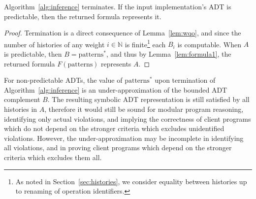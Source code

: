 \begin{theorem}
  \label{thm:algorithm}

  Algorithm~\ref{alg:inference} terminates. If the input implementation’s
  ADT is predictable, then the returned formula represents it.

\end{theorem}

\begin{proof}
  Termination is a direct consequence of Lemma~\ref{lem:wqo}, and since the
  number of histories of any weight $i \in \mathbb{N}$ is finite\footnote{
    As noted in Section~\ref{sec:histories}, we consider equality between
    histories up to renaming of operation identifiers.
  }
  each $B_i$ is computable.
  When $A$ is predictable, then $B = \text{patterns}^*$, and thus by
  Lemma~\ref{lem:formula1}, the returned formula $F(\text{patterns})$
  represents $A$.
\end{proof}

For non-predictable ADTs, the value of $\text{patterns}^*$ upon termination of
Algorithm~\ref{alg:inference} is an under-approximation of the bounded ADT
complement $B$. The resulting symbolic ADT representation is still satisfied by
all histories in $A$, therefore it would still be sound for modular program
reasoning, identifying only actual violations, and implying the correctness of
client programs which do not depend on the stronger criteria which excludes
unidentified violations. However, the under-approximation may be incomplete in
identifying all violations, and in proving client programs which depend on the
stronger criteria which excludes them all.
